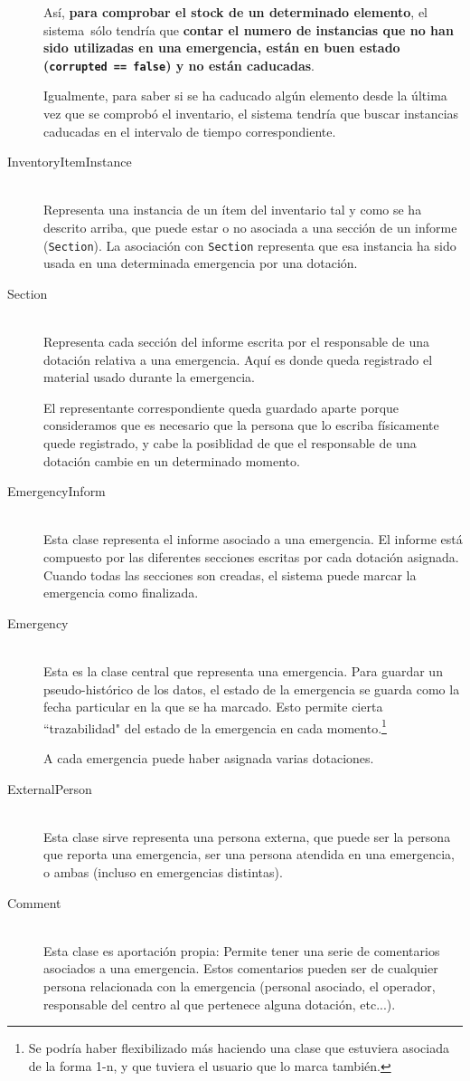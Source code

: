 \begin{description}
        Así, \textbf{para comprobar el stock de un determinado elemento}, el sistema sólo tendría que \textbf{contar el numero de instancias que no han sido utilizadas en una emergencia, están en buen estado (\texttt{corrupted == false}) y no están caducadas}. \par
        Igualmente, para saber si se ha caducado algún elemento desde la última vez que se comprobó el inventario, el sistema tendría que buscar instancias caducadas en el intervalo de tiempo correspondiente.
    \item[InventoryItemInstance] \hfill \\
        Representa una instancia de un ítem del inventario tal y como se ha descrito arriba, que puede estar o no asociada a una sección de un informe (\texttt{Section}).
        La asociación con \texttt{Section} representa que esa instancia ha sido usada en una determinada emergencia por una dotación.
    \item[Section] \hfill \\
        Representa cada sección del informe escrita por el responsable de una dotación relativa a una emergencia. Aquí es donde queda registrado el material usado durante la emergencia. \par
        El representante correspondiente queda guardado aparte porque consideramos que es necesario que la persona que lo escriba físicamente quede registrado, y cabe la posiblidad de que el responsable de una dotación cambie en un determinado momento.
    \item[EmergencyInform] \hfill \\
        Esta clase representa el informe asociado a una emergencia. El informe está compuesto por las diferentes secciones escritas por cada dotación asignada. Cuando todas las secciones son creadas, el sistema puede marcar la emergencia como finalizada.
    \item[Emergency] \hfill \\
        Esta es la clase central que representa una emergencia. Para guardar un pseudo-histórico de los datos, el estado de la emergencia se guarda como la fecha particular en la que se ha marcado. Esto permite cierta ``trazabilidad" del estado de la emergencia en cada momento.\footnote{Se podría haber flexibilizado más haciendo una clase que estuviera asociada de la forma 1-n, y que tuviera el usuario que lo marca también.} \par
        A cada emergencia puede haber asignada varias dotaciones.
    \item[ExternalPerson] \hfill \\
        Esta clase sirve representa una persona externa, que puede ser la persona que reporta una emergencia, ser una persona atendida en una emergencia, o ambas (incluso en emergencias distintas).
    \item[Comment] \hfill \\
        Esta clase es aportación propia: Permite tener una serie de comentarios asociados a una emergencia. Estos comentarios pueden ser de cualquier persona relacionada con la emergencia (personal asociado, el operador, responsable del centro al que pertenece alguna dotación, etc...).
\end{description}
